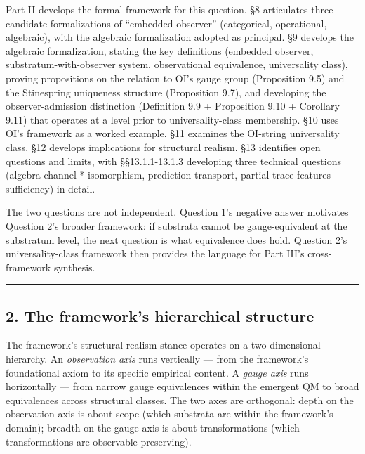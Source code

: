 \documentclass[
]{article}
\begin{document}
Part II develops the formal framework for this question. §8 articulates
three candidate formalizations of ``embedded observer'' (categorical,
operational, algebraic), with the algebraic formalization adopted as
principal. §9 develops the algebraic formalization, stating the key
definitions (embedded observer, substratum-with-observer system,
observational equivalence, universality class), proving propositions on
the relation to OI's gauge group (Proposition 9.5) and the Stinespring
uniqueness structure (Proposition 9.7), and developing the
observer-admission distinction (Definition 9.9 + Proposition 9.10 +
Corollary 9.11) that operates at a level prior to universality-class
membership. §10 uses OI's framework as a worked example. §11 examines
the OI-string universality class. §12 develops implications for
structural realism. §13 identifies open questions and limits, with
§§13.1.1-13.1.3 developing three technical questions (algebra-channel
*-isomorphism, prediction transport, partial-trace features sufficiency)
in detail.

The two questions are not independent. Question 1's negative answer
motivates Question 2's broader framework: if substrata cannot be
gauge-equivalent at the substratum level, the next question is what
equivalence does hold. Question 2's universality-class framework then
provides the language for Part III's cross-framework synthesis.

\begin{center}\rule{0.5\linewidth}{0.5pt}\end{center}

\hypertarget{the-frameworks-hierarchical-structure}{%
\subsection{2. The framework's hierarchical
structure}\label{the-frameworks-hierarchical-structure}}

The framework's structural-realism stance operates on a two-dimensional
hierarchy. An \emph{observation axis} runs vertically --- from the
framework's foundational axiom to its specific empirical content. A
\emph{gauge axis} runs horizontally --- from narrow gauge equivalences
within the emergent QM to broad equivalences across structural classes.
The two axes are orthogonal: depth on the observation axis is about
scope (which substrata are within the framework's domain); breadth on
the gauge axis is about transformations (which transformations are
observable-preserving).
\end{document}
